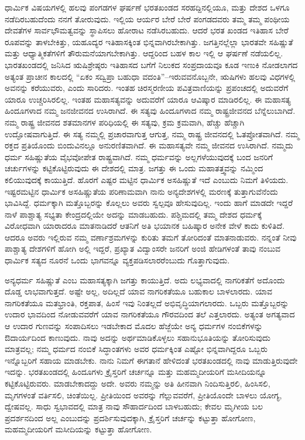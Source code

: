 ಧಾರ್ಮಿಕ ವಿಷಯಗಳಲ್ಲಿ ಹಲವು ಪಂಗಡಗಳ ಘರ್ಷಣೆ ಭರತಖಂಡದ ಸರಹದ್ದಿ\-ನಲ್ಲಿಯೂ, ಮತ್ತು ದೇಶದ ಒಳಗೂ ನಡೆದಿರಬಹುದೆಂದು ನನಗೆ ತೋರುವುದು. ಇಲ್ಲಿಯ ಆರ್ಯರ ಬೇರೆ ಬೇರೆ ಪಂಗಡದವರು ತಮ್ಮ ತಮ್ಮ ಪಂಥೀಯ ದೇವತೆಗಳ ಸಾರ್ವಭೌಮತ್ವವನ್ನು ಸ್ಥಾಪಿಸಲು ಹೋರಾಟ ನಡೆಸಿರಬಹುದು. ಆದರೆ ಭರತ ಖಂಡದ ಇತಿಹಾಸ ಬೇರೆ ರೂಪವನ್ನು ತಾಳಬೇಕಿತ್ತು, ಯಹೂದ್ಯರ ಇತಿಹಾಸಕ್ಕಿಂತ ಭಿನ್ನವಾಗಿರಬೇಕಾಗಿತ್ತು. ಜಗತ್ತಿನಲ್ಲೆಲ್ಲಾ ಭಾರತವೇ ಸಹಿಷ್ಣುತೆ ಮತ್ತು ಆಧ್ಯಾತ್ಮಿಕತೆಗಳಿಗೆ ತೌರುಮನೆಯಾಗಬೇಕಾಗಿತ್ತು. ಆದ್ದರಿಂದ ಬಹಳ ಕಾಲ ಇಲ್ಲಿ ಆ ಘರ್ಷಣೆ ನಡೆಯಲಿಲ್ಲ. ಭಾರತಖಂಡದಲ್ಲಿ ಜನಿಸಿದ ಋಷಿಶ್ರೇಷ್ಠರು ಇತಿಹಾಸದ ಬಗೆಗೆ ನಿಲುಕದ ಸಂಪ್ರದಾಯವೂ ಕೂಡ ಇಣುಕಿ ನೋಡಲಾಗದ ಅತ್ಯಂತ ಪ್ರಾಚೀನ ಕಾಲದಲ್ಲಿ “ಏಕಂ ಸದ್ವಿಪ್ರಾ ಬಹುಧಾ ವದಂತಿ”–ಇರುವವನೊಬ್ಬನೇ, ಋಷಿಗಳು ಹಲವು ವಿಧಗಳಲ್ಲಿ ಅವನನ್ನು ಕರೆಯುವರು, ಎಂದು ಸಾರಿದರು. ಇಂತಹ ಚಿರಸ್ಮರಣೀಯ ಪವಿತ್ರವಾಣಿಯನ್ನು ಪ್ರಪಂಚದಲ್ಲಿ ಅದುವರೆಗೆ ಯಾರೂ ಉಚ್ಚರಿಸಿರಲಿಲ್ಲ. ಇಂತಹ ಮಹಾಸತ್ಯವನ್ನು ಅದುವರೆಗೆ ಯಾರೂ ಆವಿಷ್ಕಾರ ಮಾಡಿರಲಿಲ್ಲ. ಈ ಮಹಾಸತ್ಯ ಹಿಂದೂಗಳಾದ ನಮ್ಮ ಜನಜೀವನದ ಉಸಿರಾಗಿದೆ. ಈ ಸತ್ಯವು ಹಿಂದೂಗಳಾದ ನಮ್ಮ ರಾಷ್ಟ್ರಜೀವನದ ಬೆನ್ನೆಲುಬಾಗಿದೆ. ನಮ್ಮ ರಾಷ್ಟ್ರ ಜೀವನದ ಶತಮಾನಗಳ ಪರಿಧಿಯಲ್ಲಿ ಈ ಸತ್ಯವು, ಕ್ರಮ ಕ್ರಮವಾಗಿ, ಹೆಚ್ಚು ಹೆಚ್ಚಾಗಿ ಉದ್ಘೋಷವಾಗುತ್ತಿದೆ. ಈ ಸತ್ಯ ನಮ್ಮಲ್ಲಿ ಪ್ರಚಾರವಾಗುತ್ತ ಆಗುತ್ತ, ನಮ್ಮ ರಾಷ್ಟ್ರ ಜೀವನದಲ್ಲಿ ಓತಪ್ರೋತವಾಗಿದೆ. ನಮ್ಮ ರಕ್ತದ ಪ್ರತಿಯೊಂದು ಬಿಂದುವಿನಲ್ಲೂ ಅನುರಣಿತವಾಗಿದೆ. ಈ ಮಹಾಸತ್ಯವೇ ನಮ್ಮ ಜೀವನದ ಉಸಿರಾಗಿದೆ. ನಮ್ಮದು ಧರ್ಮ ಸಹಿಷ್ಣುತೆಯ ವೈಭವೋಪೇತ ರಾಷ್ಟ್ರವಾಗಿದೆ. ನಮ್ಮ ಧರ್ಮವನ್ನು ಅಲ್ಲಗಳೆಯುವುದಕ್ಕೆ ಬಂದ ಜನರಿಗೆ ಚರ್ಚುಗಳನ್ನು ಕಟ್ಟಿಕೊಟ್ಟಿರುವುದು ಈ ದೇಶದಲ್ಲಿ ಮಾತ್ರ. ಜಗತ್ತು ಈ ಒಂದು ಮಹಾತತ್ತ್ವವನ್ನು ನಮ್ಮಿಂದ ಕಲಿಯುವುದಕ್ಕೆ ಕಾಯುತ್ತಿದೆ. ಹೊರಗೆ ಎಷ್ಟರ ಮಟ್ಟಿನ ಧಾರ್ಮಿಕ ಅಸಹಿಷ್ಣುತೆ ಇದೆ ಎಂಬುದು ನಿಮಗೆ ತಿಳಿಯದು. ಇಷ್ಟರಮಟ್ಟಿನ ಧಾರ್ಮಿಕ ಅಸಹಿಷ್ಣುತೆಯ ಪರಿಣಾಮವಾಗಿ ನಾನು ಅನ್ಯದೇಶಗಳಲ್ಲಿ ಮರಣಕ್ಕೆ ತುತ್ತಾಗುವೆನೆಂದು ಭಾವಿಸಿದ್ದೆ. ಧರ್ಮಕ್ಕಾಗಿ ಮತ್ತೊಬ್ಬರನ್ನು ಕೊಲ್ಲಲು ಅವರು ಸ್ವಲ್ಪವೂ ಹೇಸುವುದಿಲ್ಲ. ಇಂದು ಹಾಗೆ ಮಾಡದೇ ಇದ್ದರೆ ನಾಳೆ ಪಾಶ್ಚಾತ್ಯ ಸಭ್ಯತಾ ಕೇಂದ್ರದಲ್ಲಿಯೇ ಅದನ್ನು ಮಾಡಬಹುದು. ಪಶ್ಚಿಮದಲ್ಲಿ ತಮ್ಮ ದೇಶದ ಧರ್ಮಕ್ಕೆ ವಿರೋಧವಾಗಿ ಯಾರಾದರೂ ಮಾತನಾಡಿದರೆ ಆತನಿಗೆ ಅತಿ ಭಯಾನಕ ಬಹಿಷ್ಕಾರ ಅನೇಕ ವೇಳೆ ಕಾದು ಕುಳಿತಿದೆ. ಆದರೂ ಅವರು ಇಲ್ಲಿರುವ ನಮ್ಮ ವರ್ಣಾಶ್ರಮಗಳನ್ನು ಕುರಿತು ತಮಗೆ ತೋರಿದಂತೆ ಮಾತನಾಡುವರು. ನನ್ನಂತೆ ನೀವು ಪಾಶ್ಚಾತ್ಯ ದೇಶಗಳಿಗೆ ಹೋಗಿ ಅಲ್ಲಿ ಇದ್ದರೆ, ಪ್ರಖ್ಯಾತ ವಿದ್ವಾಂಸರೇ ಜನರಿಗೆ ಅಂಜಿ ಹೇಡಿಗಳಂತೆ ತಾವು ನಂಬುವ ಧಾರ್ಮಿಕ ಸತ್ಯದ ನೂರನೆ ಒಂದು ಭಾಗವನ್ನೂ ವ್ಯಕ್ತಪಡಿಸಲಾರರೆಂಬುದು ಗೊತ್ತಾಗುವುದು. 

ಅನ್ಯಧರ್ಮ ಸಹಿಷ್ಣುತೆ ಎಂಬ ಮಹಾಸತ್ಯಕ್ಕಾಗಿ ಜಗತ್ತು ಕಾಯುತ್ತಿದೆ. ಅದು ಲಭ್ಯವಾದಲ್ಲಿ ನಾಗರಿಕತೆಗೆ ಅದೊಂದು ದೊಡ್ಡ ಲಾಭವಾಗುತ್ತದೆ. ಅಷ್ಟೇ ಅಲ್ಲ, ಅದಿಲ್ಲದೆ ಯಾವ ನಾಗರಿಕತೆಯೂ ಬಹುಕಾಲ ಬಾಳಲಾರದು. ಯಾವ ನಾಗರಿಕತೆಯೂ ಮತಭ್ರಾಂತಿ, ರಕ್ತಪಾತ, ಹಿಂಸೆ ಇವು ನಿಂತಲ್ಲದೆ ಅಭಿವೃದ್ಧಿಯಾಗಲಾರದು. ಒಬ್ಬರು ಮತ್ತೊಬ್ಬರನ್ನು ಉದಾರ ಭಾವದಿಂದ ನೋಡುವವರೆಗೆ ಯಾವ ನಾಗರಿಕತೆಯೂ ಗೌರವದಿಂದ ತಲೆ ಎತ್ತಲಾರದು. ಅತ್ಯಂತ ಅಗತ್ಯವಾದ ಆ ಉದಾರ ಗುಣವನ್ನು ಸಂಪಾದಿಸಲು ಇಡಬೇಕಾದ ಮೊದಲ ಹೆಜ್ಜೆಯೇ ಅನ್ಯ ಧರ್ಮಗಳ ನಂಬಿಕೆ\-ಗಳನ್ನು ಔದಾರ್ಯದಿಂದ ಕಾಣುವುದು. ನಾವು ಅದನ್ನು ಅರ್ಥಮಾಡಿಕೊಳ್ಳಲು ಸಹಾನುಭೂತಿಯನ್ನು ತೋರಿಸುವುದು ಮಾತ್ರವಲ್ಲ; ನಮ್ಮ ಧರ್ಮದ ನಂಬಿಕೆ ಸಿದ್ಧಾಂತಗಳು ಅವರ ಧರ್ಮಕ್ಕಿಂತ ಎಷ್ಟೋ ಭಿನ್ನವಾಗಿದ್ದರೂ ಒಬ್ಬರು ಇನ್ನೊಬ್ಬರಿಗೆ ಸಹಾಯ ಮಾಡಬೇಕು. ನಾನು ನಿಮಗೆ ಈಗತಾನೆ ಹೇಳಿದಂತೆ ಭರತಖಂಡದಲ್ಲಿ ನಾವು ಮಾಡುತ್ತಿರುವುದೇ ಇದನ್ನು. ಭರತಖಂಡದಲ್ಲಿ ಹಿಂದೂಗಳು ಕ್ರೈಸ್ತರಿಗೆ ಚರ್ಚನ್ನೂ ಮತ್ತು ಮಹಮ್ಮದೀಯರಿಗೆ ಮಸೀದಿಯನ್ನೂ ಕಟ್ಟಿಕೊಟ್ಟಿರುವರು. ಮಾಡಬೇಕಾದದ್ದು ಅದೇ. ಅವರು ನಮ್ಮನ್ನು ಅತಿ ಹೀನವಾಗಿ ನಿಂದಿಸುತ್ತಿರಲಿ, ಹಿಂಸಿಸಲಿ, ಮೃಗಗಳಂತೆ ವರ್ತಿಸಲಿ, ಚಿಂತೆಯಿಲ್ಲ. ಪ್ರೀತಿಯಿಂದ ಅವರನ್ನು ಗೆಲ್ಲುವವರೆಗೆ, ಪ್ರೀತಿಯೊಂದೇ ಬಾಳಲು ಯೋಗ್ಯ, ದ್ವೇಷವಲ್ಲ. ಸಾಧು ಸ್ವಭಾವದಲ್ಲಿ ಮಾತ್ರ ನಾವು ಸೌಹಾರ್ದದಿಂದ ಬಾಳಬಹುದು; ಕೇವಲ ಮೃಗೀಯ ಬಲ ಪ್ರದರ್ಶನದಿಂದ ಅಲ್ಲ ಎಂಬುದನ್ನು ಪ್ರದರ್ಶಿಸುವುದಕ್ಕಾಗಿ, ಕ್ರೈಸ್ತರಿಗೆ ಚರ್ಚನ್ನು ಕಟ್ಟುತ್ತಾ ಹೋಗೋಣ, ಮಹಮ್ಮದೀಯರಿಗೆ ಮಸೀದಿಯನ್ನು ಕಟ್ಟುತ್ತಾ ಹೋಗೋಣ. 

